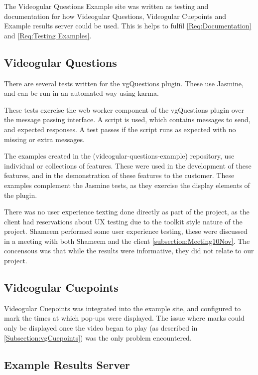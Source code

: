 The Videogular Questions Example site was written as testing and documentation for how Videogular Questions, Videogular Cuepoints and Example results server could be used. This is helps to fulfil \cref{Req:Documentation} and \cref{Req:Testing Examples}.

\subsection{Videogular Questions}
\label{Subsection:Videogular Questions in example}

There are several tests written for the \gls{vgQuestions} plugin. These use Jasmine, and can be run in an automated way using karma.

These tests exercise the web worker component of the \gls{vgQuestions} plugin over the message passing interface. A script is used, which contains messages to send, and expected responses. A test passes if the script runs as expected with no missing or extra messages.

The examples created in the (videogular-questions-example) repository, use individual or collections of features. These were used in the development of these features, and in the demonstration of these features to the customer.  These examples complement the Jasmine tests, as they exercise the display elements of the plugin.

There was no user experience texting done directly as part of the project, as the client had reservations about UX testing due to the toolkit style nature of the project. Shameem performed some user experience testing, these were discussed in a meeting with both Shameem and the client \autoref{subsection:Meeting10Nov}. The concensous was that while the results were informative, they did not relate to our project.

\subsection{Videogular Cuepoints}
\label{Subsection:Videogular Cuepoints in example}
\gls{Videogular} Cuepoints was integrated into the example site, and configured to mark the times at which pop-ups were displayed. The issue where marks could only be displayed once the video began to play (as described in \autoref{Subsection:vgCuepoints}) was the only problem encountered.

\subsection{Example Results Server}
\label{Subsection:Example Results Server in example}

